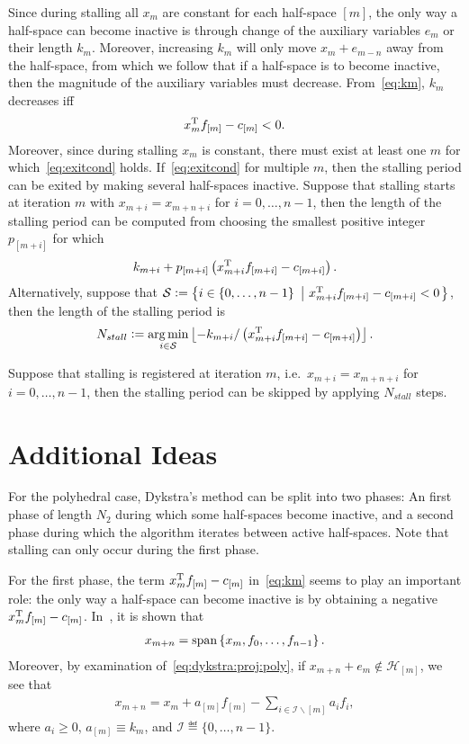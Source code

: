 \documentclass[hidelinks]{article}
\begin{document}
Since during stalling all $x_m$ are constant for each half-space $[m]$, the only way a half-space can become inactive is through change of the auxiliary variables $e_m$ or their length $k_m$. Moreover, increasing $k_m$ will only move $x_m+e_{m-n}$ away from the half-space, from which we follow that if a half-space is to become inactive, then the magnitude of the auxiliary variables must decrease. From~\eqref{eq:km}, $k_m$ decreases iff
\begin{align}\label{eq:exitcond}
x_m^{\text{T}} f_{[m]} - c_{[m]} < 0.
\end{align}
Moreover, since during stalling $x_m$ is constant, there must exist at least one $m$ for which~\eqref{eq:exitcond} holds. If~\eqref{eq:exitcond} for multiple $m$, then the stalling period can be exited by making several half-spaces inactive. Suppose that stalling starts at iteration $m$ with $x_{m+i}=x_{m+n+i}$ for $i=0,\dots,n-1$, then the length of the stalling period can be computed from choosing the smallest positive integer $p_{[m+i]}$ for which
\begin{align}
k_{m+i}+p_{[m+i]}\left(x_{m+i}^{\text{T}} f_{[m+i]} - c_{[m+i]}\right).
\end{align}
Alternatively, suppose that $\mathcal{S}\vcentcolon=\left\{ i\in\lbrace 0,\dots,n-1\rbrace\ \left| \ x_{m+i}^{\text{T}} f_{[m+i]} - c_{[m+i]}<0 \right. \right\}$, then the length of the stalling period is
\begin{align}
N_{stall}\vcentcolon=\operatorname*{arg\,min}_{i\in\mathcal{S}} \left\lfloor -k_{m+i} / \left(x_{m+i}^{\text{T}} f_{[m+i]} - c_{[m+i]}\right)\right\rfloor.
\end{align}

Suppose that stalling is registered at iteration $m$, i.e.\ $x_{m+i}=x_{m+n+i}$ for $i=0,\dots,n-1$, then the stalling period can be skipped by applying $N_{stall}$ steps.

\section{Additional Ideas}

For the polyhedral case, Dykstra's method can be split into two phases: An first phase of length $N_2$ during which some half-spaces become inactive, and a second phase during which the algorithm iterates between active half-spaces. Note that stalling can only occur during the first phase.

For the first phase, the term $x_m^{\text{T}} f_{[m]} - c_{[m]}$ in~\eqref{eq:km} seems to play an important role: the only way a half-space can become inactive is by obtaining a negative $x_m^{\text{T}} f_{[m]} - c_{[m]}$. In~\cite{DYKSTRAPERKINS}, it is shown that
\begin{align}
x_{m+n} =\operatorname*{span}\left\{ x_m, f_0,\dots,f_{n-1} \right\}.
\end{align}
Moreover, by examination of~\eqref{eq:dykstra:proj:poly}, if $x_{m+n}+e_m\not\in\mathcal{H}_{[m]}$, we see that
\begin{align}
x_{m+n} =x_m + a_{[m]}f_{[m]}-\sum_{i\in \mathcal{I} \backslash [m]} a_i f_i,
\end{align}
where $a_i\geq 0$, $a_{[m]}\equiv k_m$, and $\mathcal{I}\eqdef \lbrace 0,\dots,n-1\rbrace$.



\end{document}
